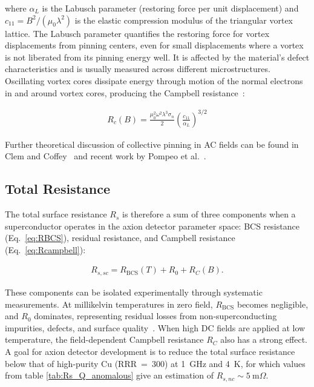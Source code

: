     \noindent where $\alpha_L$ is the Labusch parameter (restoring force per unit displacement) and $c_{11} = B^2/(\mu_0\lambda^2)$ is the elastic compression modulus of the triangular vortex lattice. The Labusch parameter \cite{labuschElasticConstantsFluxoid1969, panLabuschParameterDriven2000} quantifies the restoring force for vortex displacements from pinning centers, even for small displacements where a vortex is not liberated from its pinning energy well. It is affected by the material's defect characteristics and is usually measured across different microstructures. Oscillating vortex cores dissipate energy through motion of the normal electrons in and around vortex cores, producing the Campbell resistance~\cite{markcoffeyUnifiedTheoryEffects1991}:
    
    \begin{align}
        R_c(B) = \frac{\mu_0^2 \omega^2 \lambda^3 \sigma_n}{2}\left(\frac{c_{11}}{\alpha_L}\right)^{3/2}
        \label{eq:Rcampbell}
    \end{align}
  
    \noindent Further theoretical discussion of collective pinning in AC fields can be found in Clem and Coffey~\cite{markcoffeyUnifiedTheoryEffects1991} and recent work by Pompeo et al.~\cite{nicolapompeoReliableDeterminationVortex2008}.

    \subsection{Total Resistance} 
        
    The total surface resistance $R_s$ is therefore a sum of three components when a superconductor operates in the axion detector parameter space: BCS resistance (Eq.~\ref{eq:RBCS}), residual resistance, and Campbell resistance (Eq.~\ref{eq:Rcampbell}):
    
    \begin{align}
        R_{s,sc} = R_{\text{BCS}}(T) + R_0 + R_C(B)  \label{eq:Rs} .
    \end{align}
    
    These components can be isolated experimentally through systematic measurements. At millikelvin temperatures in zero field, $R_{\text{BCS}}$ becomes negligible, and $R_0$ dominates, representing residual losses from non-superconducting impurities, defects, and surface quality~\cite{alexgurevich33ThermalRF2006}. When high DC fields are applied at low temperature, the field-dependent Campbell resistance $R_C$ also has a strong effect. A goal for axion detector development is to reduce the total surface resistance below that of high-purity Cu (RRR~=~300) at 1~GHz and 4~K, for which values from table \ref{tab:Rs_Q_anomalous} give an estimation of $R_{s,nc} \sim 5~\text{m}\Omega$.
    

